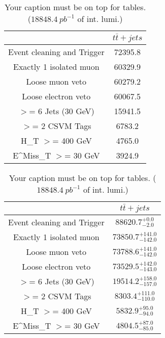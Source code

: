 \documentclass{article}
\begin{document}
\begin{table}
\caption{Your caption must be on top for tables. ($18848.4~pb^{-1}$ of int. lumi.)}
\label{tab:}
\centering
\begin{tabular}{|c|c|}
\toprule
&$t\bar{t}+jets$	\\

\midrule
Event cleaning and Trigger&	72395.8	\\

Exactly 1 isolated muon&	60329.9	\\

Loose muon veto&	60279.2	\\

Loose electron veto&	60067.5	\\

$>$= 6 Jets (30 GeV)&	15941.5	\\

$>$= 2 CSVM Tags&	6783.2	\\

H_{T} $>$=  400 GeV&	4765.0	\\

E^{Miss}_{T} $>$=  30 GeV&	3924.9	\\

\bottomrule
\end{tabular}
\end{table}
\begin{table}
\caption{Your caption must be on top for tables. ($18848.4~pb^{-1}$ of int. lumi.)}
\label{tab:}
\centering
\begin{tabular}{|c|c|}
\toprule
&$t\bar{t}+jets$	\\

\midrule
Event cleaning and Trigger&	$88620.7^{+0.0}_{-2.0}$	\\

Exactly 1 isolated muon&	$73850.7^{+141.0}_{-142.0}$	\\

Loose muon veto&	$73788.6^{+141.0}_{-142.0}$	\\

Loose electron veto&	$73529.5^{+142.0}_{-143.0}$	\\

$>$= 6 Jets (30 GeV)&	$19514.2^{+158.0}_{-157.0}$	\\

$>$= 2 CSVM Tags&	$8303.4^{+111.0}_{-110.0}$	\\

H_{T} $>$=  400 GeV&	$5832.9^{+95.0}_{-94.0}$	\\

E^{Miss}_{T} $>$=  30 GeV&	$4804.5^{+87.0}_{-85.0}$	\\

\bottomrule
\end{tabular}
\end{table}
\end{document}
